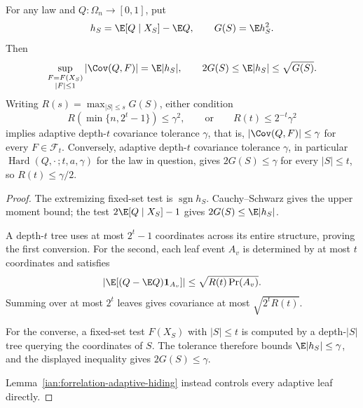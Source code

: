 \begin{lemma}\label{ian:forrelation-fixed-set-audit}
For any law and \(Q:\Omega_n\to[0,1]\), put
\[
 h_S=\E[Q\mid X_S]-\E Q,\qquad G(S)=\E h_S^2.
\]
Then
\[
 \sup_{\substack{F=F(X_S)\\|F|\le1}}|\Cov(Q,F)|
 =\E|h_S|,
 \qquad
 2G(S)\le\E|h_S|\le\sqrt{G(S)}.
\]
Writing \(R(s)=\max_{|S|\le s}G(S)\), either condition
\[
 R(\min\{n,2^t-1\})\le\gamma^2,
 \qquad\text{or}\qquad
 R(t)\le2^{-t}\gamma^2
\]
implies adaptive depth-\(t\) covariance tolerance \(\gamma\), that is, \(|\Cov(Q,F)|\le\gamma\) for every \(F\in\mathcal F_t\).
Conversely, adaptive depth-\(t\) covariance tolerance \(\gamma\), in particular \(\operatorname{Hard}(Q,\cdot\,;t,a,\gamma)\) for the law in question, gives \(2G(S)\le\gamma\) for every \(|S|\le t\), so \(R(t)\le\gamma/2\).
\end{lemma}
\begin{proof}
The extremizing fixed-set test is \(\operatorname{sgn}h_S\).
Cauchy--Schwarz gives the upper moment bound; the test
\(2\E[Q\mid X_S]-1\) gives \(2G(S)\le\E|h_S|\).

A depth-\(t\) tree uses at most \(2^t-1\) coordinates across its entire structure, proving the first conversion. For the second, each leaf event \(A_v\) is determined by at most \(t\) coordinates and satisfies
\[
 |\E[(Q-\E Q)\mathbf1_{A_v}]|
 \le\sqrt{R(t)\Pr(A_v)}.
\]
Summing over at most \(2^t\) leaves gives covariance at most
\(\sqrt{2^tR(t)}\).

For the converse, a fixed-set test \(F(X_S)\) with \(|S|\le t\) is computed by a depth-\(|S|\) tree querying the coordinates of \(S\). The tolerance therefore bounds \(\E|h_S|\le\gamma\), and the displayed inequality gives \(2G(S)\le\gamma\).

Lemma~\ref{ian:forrelation-adaptive-hiding} instead controls every adaptive leaf directly.
\end{proof}

